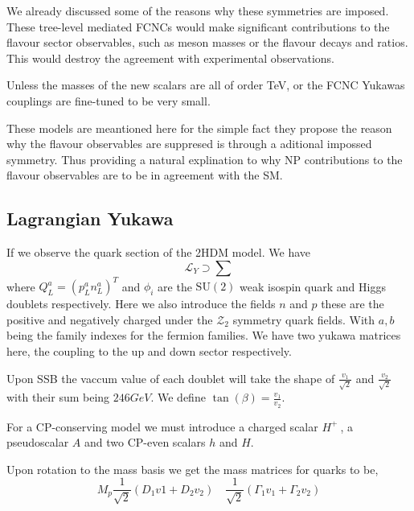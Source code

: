 We already discussed some of the reasons why these symmetries are imposed. These tree-level mediated FCNCs would make significant contributions to the flavour sector observables, such as meson masses or the flavour decays and ratios. This would destroy the agreement with experimental observations. 

Unless the masses of the new scalars are all of order TeV, or the FCNC Yukawas couplings are fine-tuned to be very small. 

These models are meantioned here for the simple fact they propose the reason why the flavour observables are suppresed is through a aditional impossed symmetry. Thus providing a natural explination to why NP contributions to the flavour observables are to be in agreement with the SM. 

\subsection{Lagrangian Yukawa}

If we observe the quark section of the 2HDM model. We have 
%
\begin{equation}
\mathcal{L}_Y \supset \sum
\end{equation}
%
where $Q^a_L = \left( p^a_L n^a_L \right)^T$ and $\phi_i$ are the $\mathrm{SU(2)}$ weak isospin quark and Higgs doublets respectively. Here we also introduce the fields $n$ and $p$ these are the positive and negatively charged  under the $\mathcal{Z}_2$ symmetry quark fields. With $a,b$ being the family indexes for the fermion families. We have two yukawa matrices here, the coupling to the up and down sector respectively. 

Upon SSB the vaccum value of each doublet will take the shape of $\frac{v_1}{\sqrt{2}}$ and $\frac{v_2}{\sqrt{2}}$ with their sum being $246 GeV$. We define $\tan(\beta)=\frac{v_1}{v_2}$.

For a CP-conserving model we must introduce a charged scalar $H^+~$, a pseudoscalar $A$ and two CP-even scalars $h$ and $H$.  

Upon rotation to the mass basis we get the mass matrices for quarks to be, 
\begin{equation}
M_p \frac{1}{\sqrt{2}} \left( D_1 v1 + D_2 v_2 \right) \quad \frac{1}{\sqrt{2}}\left( \Gamma_1 v_1 + \Gamma_2 v_2 \right)   
\end{equation}

